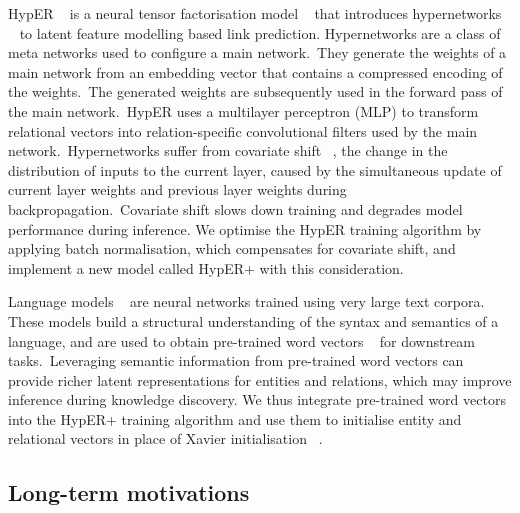 \noindent HypER \unskip~\citep{balazevic2019hypernetwork} is a neural tensor factorisation model \unskip~\citep{wu2018neural} that introduces hypernetworks \unskip~\citep{ha2016hypernetworks} to latent feature modelling based link prediction. Hypernetworks are a class of meta networks used to configure a main network.\ They generate the weights of a main network from an embedding vector that contains a compressed encoding of the weights.\ The generated weights are subsequently used in the forward pass of the main network.\ HypER uses a multilayer perceptron (MLP) to transform relational vectors into relation-specific convolutional filters used by the main network.\ Hypernetworks suffer from covariate shift \unskip~\citep{ioffe2015batch}, the change in the distribution of inputs to the current layer, caused by the simultaneous update of current layer weights and previous layer weights during backpropagation.\ Covariate shift slows down training and degrades model performance during inference. We optimise the HypER training algorithm by applying batch normalisation, which compensates for covariate shift, and implement a new model called HypER+ with this consideration. \par

\noindent Language models \unskip~\citep{turian2010word} are neural networks trained using very large text corpora. These models build a structural understanding of the syntax and semantics of a language, and are used to obtain pre-trained word vectors \unskip~\citep{mikolov2013distributed} for downstream tasks.\ Leveraging semantic information from pre-trained word vectors can provide richer latent representations for entities and relations, which may improve inference during knowledge discovery. We thus integrate pre-trained word vectors into the HypER+ training algorithm and use them to initialise entity and relational vectors in place of Xavier initialisation \unskip~\citep{glorot2010understanding}. 

\subsection{Long-term motivations} 

